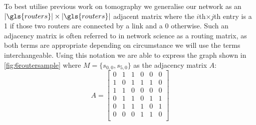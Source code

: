     To best utilise previous work on tomography we generalise our network as an $|\gls{routers}|\times|\gls{routers}|$ adjacent matrix where the $i$th$\times j$th entry is a 1 if those two routers are connected by a link and a 0 otherwise. Such an adjacency matrix is often referred to in network science as a routing matrix, as both terms are appropriate depending on circumstance we will use the terms interchangeable. Using this notation we are able to express the graph shown in \cref{fig:6routersample} where $M=\{s_{0,0},s_{5,0}\}$ as the adjacency matrix $A$:
    \begin{equation}\label{eq:6routeradjmatrix}
        A = \begin{bmatrix} 
            0 & 1 & 1 & 0 & 0 & 0 \\
            1 & 0 & 1 & 1 & 1 & 0 \\
            1 & 1 & 0 & 0 & 0 & 0 \\
            0 & 1 & 1 & 0 & 1 & 1 \\
            0 & 1 & 1 & 1 & 0 & 1 \\
            0 & 0 & 0 & 1 & 1 & 0 \\\end{bmatrix}
    \end{equation}
    
